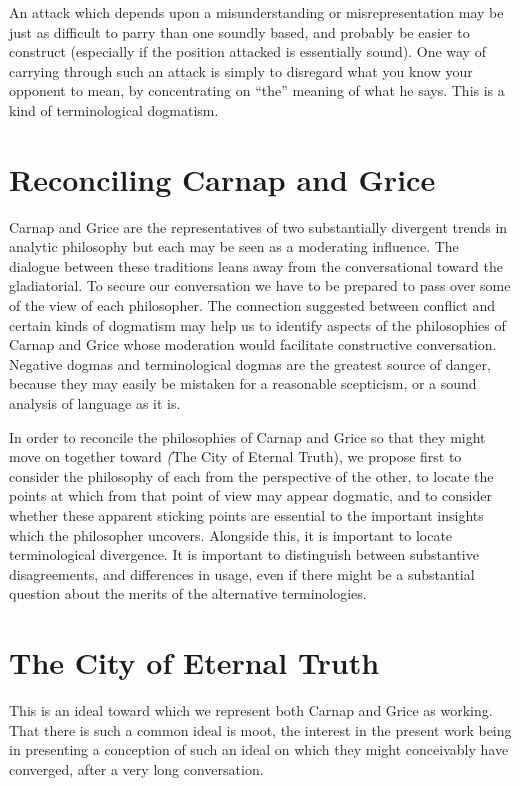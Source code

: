 \documentclass[10pt,titlepage]{book}
\begin{document}
An attack which depends upon a misunderstanding or misrepresentation may be just as difficult to parry than one soundly based, and probably be easier to construct (especially if the position attacked is essentially sound).
One way of carrying through such an attack is simply to disregard what you know your opponent to mean, by concentrating on ``the'' meaning of what he says.
This is a kind of terminological dogmatism.

\section{Reconciling Carnap and Grice}

Carnap and Grice are the representatives of two substantially divergent trends in analytic philosophy but each may be seen as a moderating influence.
The dialogue between these traditions leans away from the conversational toward the gladiatorial.
To secure our conversation we have to be prepared to pass over some of the view of each philosopher.
The connection suggested between conflict and certain kinds of dogmatism may help us to identify aspects of the philosophies of Carnap and Grice whose moderation would facilitate constructive conversation.
Negative dogmas and terminological dogmas are the greatest source of danger, because they may easily be mistaken for a reasonable scepticism, or a sound analysis of language as it is.

In order to reconcile the philosophies of Carnap and Grice so that they might move on together toward \emph(The City of Eternal Truth), we propose first to consider the philosophy of each from the perspective of the other, to locate the points at which from that point of view may appear dogmatic, and to consider whether these apparent sticking points are essential to the important insights which the philosopher uncovers.
Alongside this, it is important to locate terminological divergence.
It is important to distinguish between substantive disagreements, and differences in usage, even if there might be a substantial question about the merits of the alternative terminologies.

\section{The City of Eternal Truth}

This is an ideal toward which we represent both Carnap and Grice as working.
That there is such a common ideal is moot, the interest in the present work being in presenting a conception of such an ideal on which they might conceivably have converged, after a very long conversation.
\end{document}

